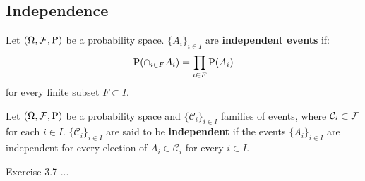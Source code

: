 \subsection{Independence}

\begin{definition}
	Let $\PS$ be a probability space. $\{ A_i \}_{i \in I }$ are \textbf{independent events} if:
	\[
		\P (\cap_{i \in F} A_i) = \prod_{i \in F} \P(A_i)
	\]
	for every finite subset $F \subset I$.
\end{definition}

\begin{definition}
	Let $\PS$ be a probability space and $\{ \mathcal{C}_i \}_{i \in I}$ families of events, where $\mathcal{C}_i \subset \F$ for each $i \in I$. $\{ \mathcal{C}_i \}_{i \in I}$ are said to be \textbf{independent} if the events $\{ A_i \}_{i \in I }$ are independent for every election of $A_i \in \mathcal{C}_i$ for every $i \in I$.
\end{definition}

\begin{example}
	Exercise 3.7 ...
\end{example}